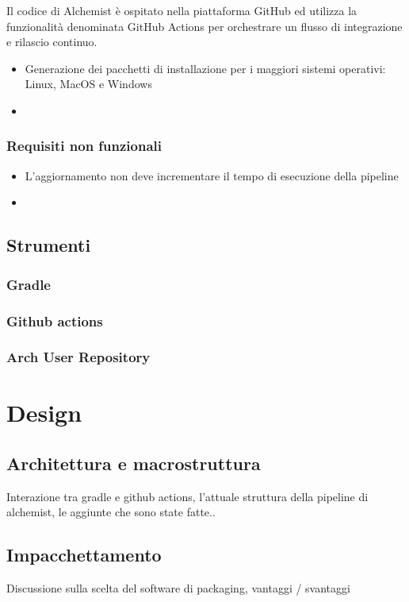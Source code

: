\documentclass[12pt,a4paper,openright,twoside]{book}
\begin{document}
Il codice di Alchemist è ospitato nella piattaforma GitHub ed utilizza la funzionalità denominata GitHub Actions per orchestrare un flusso di integrazione e rilascio continuo. 

\begin{itemize}
	\item Generazione dei pacchetti di installazione per i maggiori sistemi operativi: Linux, MacOS e Windows
	\item 
\end{itemize}

\subsection{Requisiti non funzionali}
\begin{itemize}
	\item L'aggiornamento non deve incrementare il tempo di esecuzione della pipeline
	\item 
\end{itemize}

\section{Strumenti}

\subsection{Gradle}

\subsection{Github actions}

\subsection{Arch User Repository}

\chapter{Design}

\section{Architettura e macrostruttura}
Interazione tra gradle e github actions, l’attuale struttura della pipeline di alchemist, le aggiunte che sono state fatte..

\section{Impacchettamento}
Discussione sulla scelta del software di packaging, vantaggi / svantaggi
\end{document}
